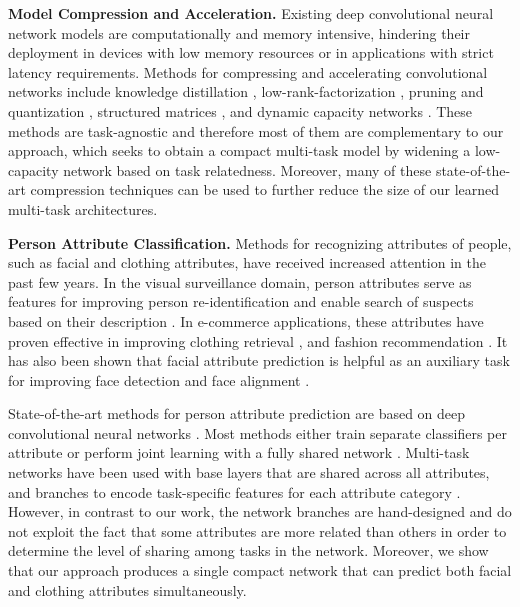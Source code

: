 \documentclass[10pt,twocolumn,letterpaper]{article}
\begin{document}
{\bf Model Compression and Acceleration.} Existing deep convolutional neural network models are computationally and memory intensive, hindering their deployment in devices with low memory resources or in applications with strict latency requirements.  Methods for compressing and accelerating convolutional networks include knowledge distillation \cite{Hinton15,romero2014fitnets}, low-rank-factorization \cite{ioannou2015training,tai2015convolutional,sainath2013low}, pruning and quantization \cite{han2015deep,polyak2015channel}, structured matrices \cite{Circulant15,sindhwani2015structured,gong2016tamp}, and dynamic capacity networks \cite{almahairi2015dynamic}. These methods are task-agnostic and therefore most of them are complementary to our approach, which seeks to obtain a compact multi-task model by widening a low-capacity network based on task relatedness. 
Moreover, many of these state-of-the-art compression techniques can be used to further reduce the size of our learned multi-task architectures. 

{\bf Person Attribute Classification.} Methods for recognizing attributes of people, such as facial and clothing attributes, have received increased attention in the past few years. In the visual surveillance domain, person attributes serve as features for improving person re-identification \cite{su2016deep} and enable search of suspects based on their description \cite{vaquero2009attribute,feris2014attribute}. In e-commerce applications, these attributes have proven effective in improving clothing retrieval \cite{huang2015cross}, and fashion recommendation \cite{liu2014wow}. It has also been shown that facial attribute prediction is helpful as an auxiliary task for improving face detection \cite{yang2015facial} and face alignment \cite{zhang2016learning}.

State-of-the-art methods for person attribute prediction are based on deep convolutional neural networks \cite{wang2016walk,liu2015deep,chen2015deep,zhang2014panda}. Most methods either train separate classifiers per attribute \cite{zhang2014panda} or perform joint learning with a fully shared network \cite{rudd2016moon}.  Multi-task networks have been used with base layers that are shared across all attributes, and branches to encode task-specific features for each attribute category \cite{huang2015cross,sudowe2015person}. However, in contrast to our work, the network branches are hand-designed and do not exploit the fact that some attributes are more related than others in order to determine the level of sharing among tasks in the network. Moreover, we show that our approach produces a single compact network that can predict both facial and clothing attributes simultaneously.
\end{document}
